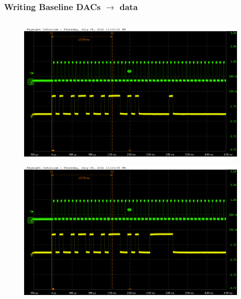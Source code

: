 \documentclass[aspectratio=169]{beamer}
\begin{document}
	\begin{frame}
	\frametitle{Writing Baseline DACs $\rightarrow$ data}
	\begin{columns}
		\begin{center}
			\begin{figure}
				\includegraphics[width=0.55 \textwidth]{IMG/probe/09-08-2021_ch05-write01-baselinedac1.png}
				\caption{}
			\end{figure}
			\begin{figure}
				\includegraphics[width=0.55 \textwidth]{IMG/probe/09-08-2021_ch05-write63-baselinedac1.png}
				\caption{}
			\end{figure}		
		\end{center}
		

\end{columns}
\end{frame}
\end{document}
